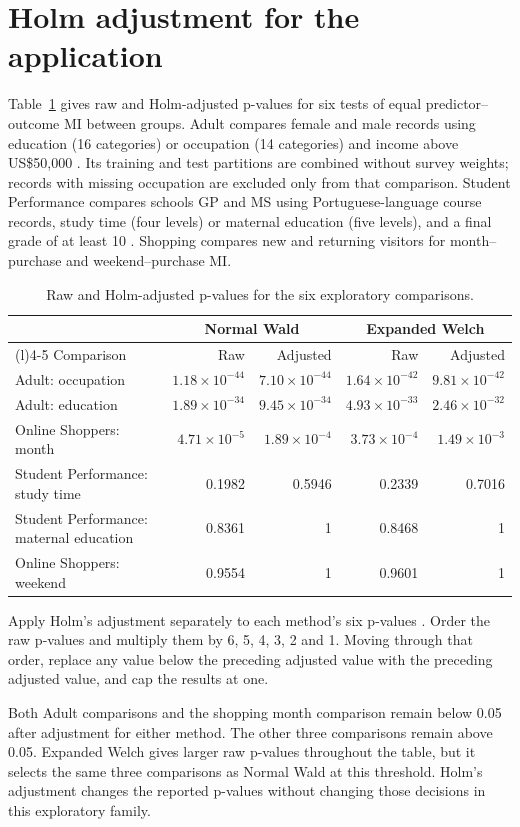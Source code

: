 \section{Holm adjustment for the application}
\label{sec:application-holm}

Table~\ref{tab:application-holm} gives raw and Holm-adjusted p-values for
six tests of equal predictor--outcome MI between groups. Adult compares
female and male records using education (16 categories) or occupation
(14 categories) and income above US\$50,000 \citep{becker1996}. Its
training and test partitions are combined without survey weights;
records with missing occupation are excluded only from that comparison.
Student Performance compares schools GP and MS using Portuguese-language
course records, study time (four levels) or maternal education (five levels),
and a final grade of at least 10 \citep{cortez2008}. Shopping compares new and returning visitors for
month--purchase and weekend--purchase MI.

\begin{table}[H]
\centering
\small
\caption{Raw and Holm-adjusted p-values for the six exploratory comparisons.}
\label{tab:application-holm}
\setlength{\tabcolsep}{4pt}
\begin{tabularx}{\textwidth}{@{}>{\raggedright\arraybackslash}Xrrrr@{}}
\toprule
& \multicolumn{2}{c}{Normal Wald} & \multicolumn{2}{c}{Expanded Welch}\\
\cmidrule(lr){2-3}\cmidrule(l){4-5}
Comparison & Raw & Adjusted & Raw & Adjusted\\
\midrule
Adult: occupation & \(1.18\times10^{-44}\) & \(7.10\times10^{-44}\) & \(1.64\times10^{-42}\) & \(9.81\times10^{-42}\)\\
Adult: education & \(1.89\times10^{-34}\) & \(9.45\times10^{-34}\) & \(4.93\times10^{-33}\) & \(2.46\times10^{-32}\)\\
Online Shoppers: month & \(4.71\times10^{-5}\) & \(1.89\times10^{-4}\) & \(3.73\times10^{-4}\) & \(1.49\times10^{-3}\)\\
Student Performance: study time & 0.1982 & 0.5946 & 0.2339 & 0.7016\\
Student Performance: maternal education & 0.8361 & 1 & 0.8468 & 1\\
Online Shoppers: weekend & 0.9554 & 1 & 0.9601 & 1\\
\bottomrule
\end{tabularx}
\end{table}

Apply Holm's adjustment separately to each method's six p-values
\citep{holm1979}. Order the raw p-values and multiply them by 6, 5, 4,
3, 2 and 1. Moving through that order, replace any value below the
preceding adjusted value with the preceding adjusted value, and cap the
results at one.

Both Adult comparisons and the shopping month comparison remain below
0.05 after adjustment for either method. The other three comparisons
remain above 0.05. Expanded Welch gives larger raw p-values
throughout the table, but it selects the same three comparisons as
Normal Wald at this threshold. Holm's adjustment changes the reported
p-values without changing those decisions in this exploratory family.
